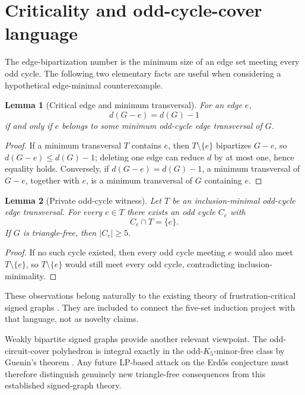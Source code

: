 \documentclass[11pt]{article}
\newtheorem{lemma}{Lemma}
\newcommand{\dd}{d}
\begin{document}
\section{Criticality and odd-cycle-cover language}

The edge-bipartization number is the minimum size of an edge set meeting
every odd cycle.  The following two elementary facts are useful when
considering a hypothetical edge-minimal counterexample.

\begin{lemma}[Critical edge and minimum transversal]
For an edge $e$,
\[
\dd(G-e)=\dd(G)-1
\]
if and only if $e$ belongs to some minimum odd-cycle edge transversal of
$G$.
\end{lemma}

\begin{proof}
If a minimum transversal $T$ contains $e$, then $T\setminus\{e\}$
bipartizes $G-e$, so $\dd(G-e)\le\dd(G)-1$; deleting one edge can reduce
$\dd$ by at most one, hence equality holds.  Conversely, if
$\dd(G-e)=\dd(G)-1$, a minimum transversal of $G-e$, together with $e$,
is a minimum transversal of $G$ containing $e$.
\end{proof}

\begin{lemma}[Private odd-cycle witness]
Let $T$ be an inclusion-minimal odd-cycle edge transversal.  For every
$e\in T$ there exists an odd cycle $C_e$ with
\[
C_e\cap T=\{e\}.
\]
If $G$ is triangle-free, then $|C_e|\ge5$.
\end{lemma}

\begin{proof}
If no such cycle existed, then every odd cycle meeting $e$ would also meet
$T\setminus\{e\}$, so $T\setminus\{e\}$ would still meet every odd cycle,
contradicting inclusion-minimality.
\end{proof}

These observations belong naturally to the existing theory of
frustration-critical signed graphs \cite{CappelloSteffen}.  They are
included to connect the five-set induction project with that language, not
as novelty claims.

Weakly bipartite signed graphs provide another relevant viewpoint.  The
odd-circuit-cover polyhedron is integral exactly in the odd-$K_5$-minor-free
class by Guenin's theorem \cite{Schrijver,Guenin}.  Any future LP-based
attack on the Erd\H{o}s conjecture must therefore distinguish genuinely new
triangle-free consequences from this established signed-graph theory.
\end{document}
